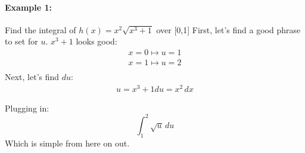 \documentclass[../revisedmain.tex]{subfiles}
\begin{document}
	\paragraph{Example 1:} Find the integral of $h(x)=x^2\sqrt{x^3+1}$ over [0,1]
	First, let's find a good phrase to set for $u$. $x^3+1$ looks good:
	\begin{gather*}
		x=0\mapsto u=1\\
		x=1\mapsto u=2\\
	\end{gather*}
	Next, let's find $du$:
	\begin{gather*}
	u=x^3+1
	du=x^2\, dx
	\end{gather*}

	Plugging in:
	\[
	\int_{1}^{2}\sqrt{u}\, du
	\]
	Which is simple from here on out.\\
\end{document}

